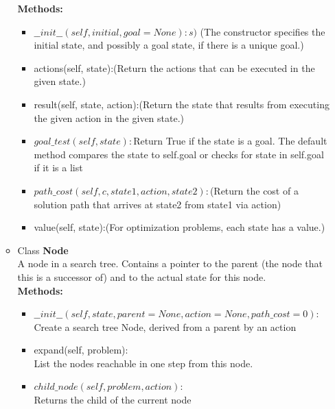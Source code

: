 \documentclass{article}
\begin{document}
\begin{enumerate}
\begin{itemize}
\begin{itemize}
           
       \end{itemize}
       \textbf {Methods:}
        \begin{itemize}
           \item  $\_\_init\_\_(self, initial, goal=None):s)$
           (The constructor specifies the initial state, and possibly a goal
        state, if there is a unique goal.)
            \item actions(self, state):(Return the actions that can be executed in the given
        state.)
        \item result(self, state, action):(Return the state that results from executing the given
        action in the given state.)
        \newpage
        \item $goal\_test(self, state):$Return True if the state is a goal. The default method compares the
        state to self.goal or checks for state in self.goal if it is a
        list
        \item $path\_cost(self, c, state1, action, state2):$(Return the cost of a solution path that arrives at state2 from
        state1 via action)
        \item value(self, state):(For optimization problems, each state has a value.)
       \end{itemize}
       \item Class \textbf{Node}\\
       A node in a search tree. Contains a pointer to the parent (the node
    that this is a successor of) and to the actual state for this node.
       \\\textbf{Methods:}
       \begin{itemize}
           \item  $\_\_init\_\_(self, state, parent=None, action=None, path\_cost=0):$
           \\Create a search tree Node, derived from a parent by an action
           \item expand(self, problem):\\List the nodes reachable in one step from this node.
           \item $child\_node(self, problem, action):$
           \\Returns the child of the current node
           

\end{itemize}
\end{itemize}
\end{enumerate}
\end{document}

